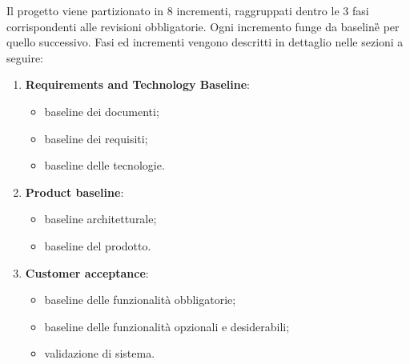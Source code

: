 Il progetto viene partizionato in 8 incrementi, raggruppati dentro le 3 fasi corrispondenti alle revisioni obbligatorie. Ogni incremento funge da baseline\G{} per quello successivo. Fasi ed incrementi vengono descritti in dettaglio nelle sezioni a seguire:
\begin{enumerate}
    \item \textbf{Requirements and Technology Baseline}:
    \begin{itemize} 
    \item baseline dei documenti;
    \item baseline dei requisiti;
    \item baseline delle tecnologie.
    \end{itemize}
    \item \textbf{Product baseline}:
    \begin{itemize} 
        \item baseline architetturale; 
        \item baseline del prodotto.
    \end{itemize}
    \item \textbf{Customer acceptance}:
    \begin{itemize}
        \item baseline delle funzionalità obbligatorie;
        \item baseline delle funzionalità opzionali e desiderabili;
        \item validazione di sistema.
    \end{itemize}
\end{enumerate}

